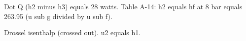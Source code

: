Dot Q (h2 minus h3) equals 28 watts.  
Table A-14:  
h2 equals hf at 8 bar equals 263.95 (u sub g divided by u sub f).  

Drossel isenthalp (crossed out).  
u2 equals h1.